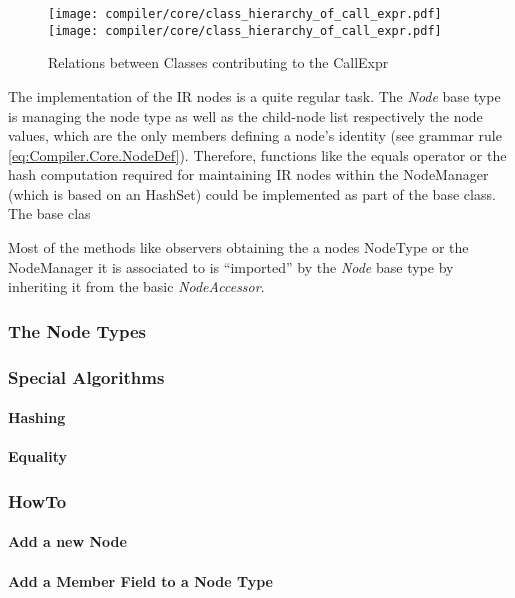 \begin{figure}[h]
	\centering
	\texttt{[image: compiler/core/class\_hierarchy\_of\_call\_expr.pdf]}
	\texttt{[image: compiler/core/class\_hierarchy\_of\_call\_expr.pdf]}
	\label{fig:Compiler.Core.Classes.CallExpr}
	\caption{Relations between Classes contributing to the CallExpr}
\end{figure}


The implementation of the IR nodes is a quite regular task. The \textit{Node}
base type is managing the node type as well as the child-node list respectively
the node values, which are the only members defining a node's identity (see
grammar rule \ref{eq:Compiler.Core.NodeDef}). Therefore, functions like the
equals operator or the hash computation required for maintaining IR nodes
within the NodeManager (which is based on an HashSet) could be implemented
as part of the base class. The base clas

Most of the
methods like observers obtaining the a nodes NodeType or the
NodeManager it is associated to is ``imported'' by the \textit{Node} base type
by inheriting it from the basic \textit{NodeAccessor}. 


\subsubsection{The Node Types}

\subsubsection{Special Algorithms}
\paragraph{Hashing}
\paragraph{Equality}

\subsubsection{HowTo}
\paragraph{Add a new Node}
\paragraph{Add a Member Field to a Node Type}

